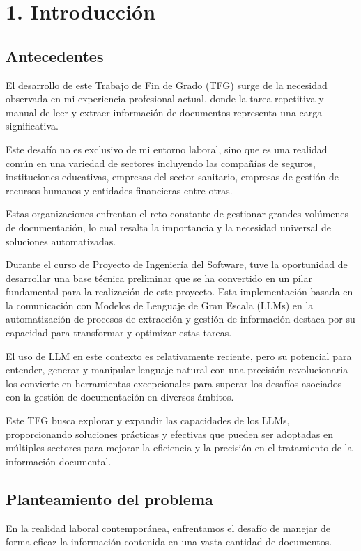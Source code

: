 \usepackage[utf8]{inputenc}
\usepackage[T1]{fontenc}\chapter*{1. Introducción}
\section*{Antecedentes}
El desarrollo de este Trabajo de Fin de Grado (TFG) surge de la necesidad observada en mi experiencia profesional actual, donde la tarea repetitiva y manual de leer y extraer información de documentos representa una carga significativa.

Este desafío no es exclusivo de mi entorno laboral, sino que es una realidad común en una variedad de sectores incluyendo las compañías de seguros, instituciones educativas, empresas del sector sanitario, empresas de gestión de recursos humanos y entidades financieras entre otras.

Estas organizaciones enfrentan el reto constante de gestionar grandes volúmenes de documentación, lo cual resalta la importancia y la necesidad universal de soluciones automatizadas.

Durante el curso de Proyecto de Ingeniería del Software, tuve la oportunidad de desarrollar una base técnica preliminar que se ha convertido en un pilar fundamental para la realización de este proyecto. Esta implementación basada en la comunicación con Modelos de Lenguaje de Gran Escala (LLMs) en la automatización de procesos de extracción y gestión de información destaca por su capacidad para transformar y optimizar estas tareas.

El uso de LLM en este contexto es relativamente reciente, pero su potencial para entender, generar y manipular lenguaje natural con una precisión revolucionaria los convierte en herramientas excepcionales para superar los desafíos asociados con la gestión de documentación en diversos ámbitos.

Este TFG busca explorar y expandir las capacidades de los LLMs, proporcionando soluciones prácticas y efectivas que pueden ser adoptadas en múltiples sectores para mejorar la eficiencia y la precisión en el tratamiento de la información documental.

\section*{Planteamiento del problema}
En la realidad laboral contemporánea, enfrentamos el desafío de manejar de forma eficaz la información contenida en una vasta cantidad de documentos.

